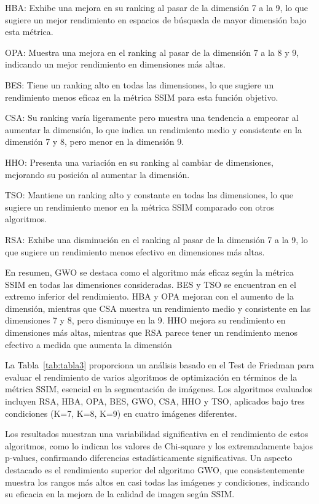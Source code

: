 \documentclass[conference]{IEEEtran}
\begin{document}
\noindent HBA: Exhibe una mejora en su ranking al pasar de la dimensión 7 a la 9, lo que sugiere un mejor rendimiento en espacios de búsqueda de mayor dimensión bajo esta métrica.

\noindent OPA: Muestra una mejora en el ranking al pasar de la dimensión 7 a la 8 y 9, indicando un mejor rendimiento en dimensiones más altas.

\noindent BES: Tiene un ranking alto en todas las dimensiones, lo que sugiere un rendimiento menos eficaz en la métrica SSIM para esta función objetivo.

\noindent CSA: Su ranking varía ligeramente pero muestra una tendencia a empeorar al aumentar la dimensión, lo que indica un rendimiento medio y consistente en la dimensión 7 y 8, pero menor en la dimensión 9.

\noindent HHO: Presenta una variación en su ranking al cambiar de dimensiones, mejorando su posición al aumentar la dimensión.

\noindent TSO: Mantiene un ranking alto y constante en todas las dimensiones, lo que sugiere un rendimiento menor en la métrica SSIM comparado con otros algoritmos.

\noindent RSA: Exhibe una disminución en el ranking al pasar de la dimensión 7 a la 9, lo que sugiere un rendimiento menos efectivo en dimensiones más altas.

\noindent En resumen, GWO se destaca como el algoritmo más eficaz según la métrica SSIM en todas las dimensiones consideradas. BES y TSO se encuentran en el extremo inferior del rendimiento. HBA y OPA mejoran con el aumento de la dimensión, mientras que CSA muestra un rendimiento medio y consistente en las dimensiones 7 y 8, pero disminuye en la 9. HHO mejora su rendimiento en dimensiones más altas, mientras que RSA parece tener un rendimiento menos efectivo a medida que aumenta la dimensión


\noindent La Tabla~\ref{tab:tabla3} proporciona un análisis basado en el Test de Friedman para evaluar el rendimiento de varios algoritmos de optimización en términos de la métrica SSIM, esencial en la segmentación de imágenes. Los algoritmos evaluados incluyen RSA, HBA, OPA, BES, GWO, CSA, HHO y TSO, aplicados bajo tres condiciones (K=7, K=8, K=9) en cuatro imágenes diferentes. 

\noindent Los resultados muestran una variabilidad significativa en el rendimiento de estos algoritmos, como lo indican los valores de Chi-square y los extremadamente bajos p-values, confirmando diferencias estadísticamente significativas. Un aspecto destacado es el rendimiento superior del algoritmo GWO, que consistentemente muestra los rangos más altos en casi todas las imágenes y condiciones, indicando su eficacia en la mejora de la calidad de imagen según SSIM. 
\end{document}
